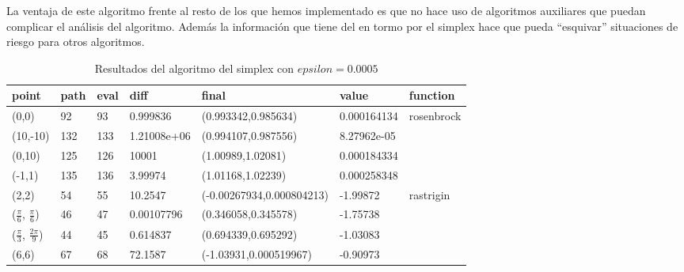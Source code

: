 \documentclass[10pt]{article}
\theoremstyle{definition}
\begin{document}
La ventaja de este algoritmo frente al resto de los que hemos
implementado es que no hace uso de algoritmos auxiliares que puedan
complicar el análisis del algoritmo. Además la información que tiene
del en tormo por el simplex hace que pueda ``esquivar'' situaciones de
riesgo para otros algoritmos.

\begin{table}[H]\centering%
\begin{tabular}{|l|lllll|l|} \hline
\bf point                           & \bf  path & \bf  eval & \bf  diff   & \bf  final                & \bf  value  & \bf  function               \\ \hline\hline
(0,0)                               & 92        & 93        & 0.999836    & (0.993342,0.985634)       & 0.000164134 & \multirow{4}{*}{rosenbrock} \\
(10,-10)                            & 132       & 133       & 1.21008e+06 & (0.994107,0.987556)       & 8.27962e-05 &                             \\
(0,10)                              & 125       & 126       & 10001       & (1.00989,1.02081)         & 0.000184334 &                             \\
(-1,1)                              & 135       & 136       & 3.99974     & (1.01168,1.02239)         & 0.000258348 &                             \\ \hline\hline
(2,2)                               & 54        & 55        & 10.2547     & (-0.00267934,0.000804213) & -1.99872    & \multirow{4}{*}{rastrigin}  \\
($\frac{\pi}{6}$, $\frac{\pi}{6}$)  & 46        & 47        & 0.00107796  & (0.346058,0.345578)       & -1.75738    &                             \\
($\frac{\pi}{3}$, $\frac{2\pi}{9}$) & 44        & 45        & 0.614837    & (0.694339,0.695292)       & -1.03083    &                             \\
(6,6)                               & 67        & 68        & 72.1587     & (-1.03931,0.000519967)    & -0.90973    &                             \\ \hline
\end{tabular}%
\caption{Resultados del algoritmo del simplex con $epsilon=0.0005$}%
\end{table}
\vspace{-1.5em}
\end{document}
